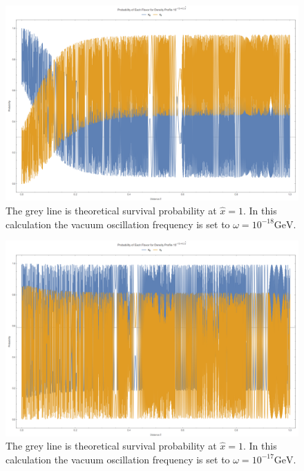 \documentclass[letterpaper,12pt,english]{sphinxmanual}
\begin{document}
\begin{figure}[htbp]
\centering
\capstart

\includegraphics{compThNu13-3.png}
\caption{The grey line is theoretical survival probability at \(\hat x = 1\). In this calculation the vacuum oscillation frequency is set to \(\omega = 10^{-18} \mathrm{GeV}\).}\end{figure}
\begin{figure}[htbp]
\centering
\capstart

\includegraphics{compThNu13-4.png}
\caption{The grey line is theoretical survival probability at \(\hat x = 1\). In this calculation the vacuum oscillation frequency is set to \(\omega = 10^{-17} \mathrm{GeV}\).}\end{figure}
\end{document}

